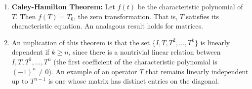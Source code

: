 \documentclass[10pt]{article}
\begin{document}
\begin{multicols*}{2}
\begin{enumerate}
\begin{enumerate}
\begin{enumerate}
        \end{enumerate}
        \item \textbf{Caley-Hamilton Theorem:} Let $f(t)$ be the characteristic polynomial of $T$. Then $f(T) = T_0$, the zero transformation. That is, $T$ satisfies its characteristic equation. An analagous result holds for matrices.
        \item An implication of this theorem is that the set $\{ I, T, T^2, \hdots, T^k \}$ is linearly dependent if $k \geq n$, since there is a nontrivial linear relation between $I, T, T^2, \hdots, T^n$ (the first coefficient of the characteristic polynomial is $(-1)^n \neq 0$). An example of an operator $T$ that remains linearly independent up to $T^{n-1}$ is one whose matrix has distinct entries on the diagonal. 
    \end{enumerate}
    

\end{enumerate}
\end{multicols*}
\end{document}
